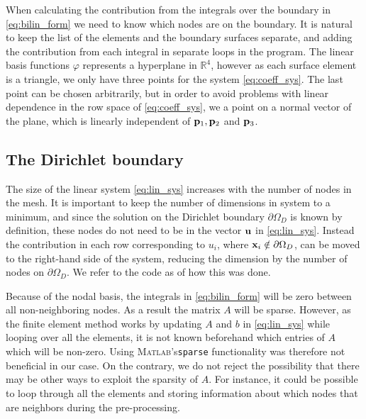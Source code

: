 When calculating the contribution from the integrals over the boundary in \eqref{eq:bilin_form} we need to know which nodes are on the boundary. It is natural to keep the list of the elements and the boundary surfaces separate, and adding the contribution from each integral in separate loops in the program. The linear basis functions $\varphi$ represents a hyperplane in $\mathbb{R}^4$, however as each surface element is a triangle, we only have three points for the system \eqref{eq:coeff_sys}. The last point can be chosen arbitrarily, but in order to avoid problems with linear dependence in the row space of \eqref{eq:coeff_sys}, we a point on a normal vector of the plane, which is linearly independent of $\vb{p}_1,\vb{p}_2$ and $\vb{p}_3$.

\subsection{The Dirichlet boundary}
 The size of the linear system \eqref{eq:lin_sys} increases with the number of nodes in the mesh. It is important to keep the number of dimensions in system to a minimum, and since the solution on the Dirichlet boundary $\partial\Omega_D$ is known by definition, these nodes do not need to be in the vector $\vb{u}$ in \eqref{eq:lin_sys}. Instead the contribution in each row corresponding to $u_i$, where $\vb{x}_i \notin \partial\Omega_D$, can be moved to the right-hand side of the system, reducing the dimension by the number of nodes on $\partial\Omega_D$. We refer to the code as of how this was done.

 Because of the nodal basis, the integrals in \eqref{eq:bilin_form} will be zero between all non-neighboring nodes. As a result the matrix $A$ will be sparse. However, as the finite element method works by updating $A$ and $b$ in \eqref{eq:lin_sys} while looping over all the elements, it is not known beforehand which entries of $A$ which will be non-zero. Using \textsc{Matlab}'s\xspace \texttt{sparse} functionality was therefore not beneficial in our case. On the contrary, we do not reject the possibility that there may be other ways to exploit the sparsity of $A$. For instance, it could be possible to loop through all the elements and storing information about which nodes that are neighbors during the pre-processing.


